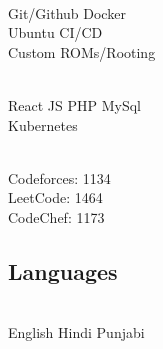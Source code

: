 \documentclass[]{deedy-resume-openfont}
\begin{document}
\begin{minipage}[t]{0.33\textwidth}
 \\
\textbullet{} Git/Github \textbullet{} Docker \\ \textbullet{} Ubuntu \textbullet{} CI/CD \\ \textbullet{} Custom ROMs/Rooting \\
\sectionsep

 \\
\textbullet{} React JS \textbullet{} PHP \textbullet{} MySql \\ \textbullet{} Kubernetes
\sectionsep

 \\
\textbullet{} Codeforces: 1134 \\
\textbullet{} LeetCode: 1464 \\
\textbullet{} CodeChef: 1173 \\
\sectionsep

\subsection{Languages} \\
\textbullet{} English \textbullet{} Hindi \textbullet{} Punjabi
\sectionsep

%
%

\end{minipage} 
\hfill
\end{document}

